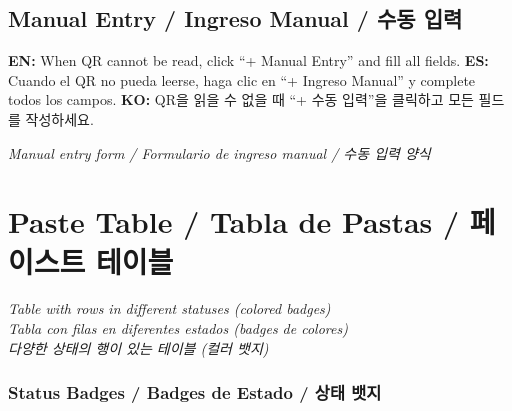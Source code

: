 \documentclass[12pt,a4paper]{article}
\newcommand{\tri}[3]{%
  \textbf{EN:} #1 \quad\textbar\quad \textbf{ES:} #2 \quad\textbar\quad \textbf{KO:} #3%
}
\begin{document}
\subsection{Manual Entry / Ingreso Manual / 수동 입력}

\tri{When QR cannot be read, click ``+ Manual Entry'' and fill all fields.}
{Cuando el QR no pueda leerse, haga clic en ``+ Ingreso Manual'' y complete todos los campos.}
{QR을 읽을 수 없을 때 ``+ 수동 입력''을 클릭하고 모든 필드를 작성하세요.}

\begin{photobox}
\centering
\vspace{3.5cm}
\textit{Manual entry form / Formulario de ingreso manual / 수동 입력 양식}
\vspace{0.5cm}
\end{photobox}

\section{Paste Table / Tabla de Pastas / 페이스트 테이블}

\begin{photobox}
\centering
\vspace{4.5cm}
\textit{Table with rows in different statuses (colored badges)\\
Tabla con filas en diferentes estados (badges de colores)\\
다양한 상태의 행이 있는 테이블 (컬러 뱃지)}
\vspace{0.5cm}
\end{photobox}

\subsubsection*{Status Badges / Badges de Estado / 상태 뱃지}
\end{document}
